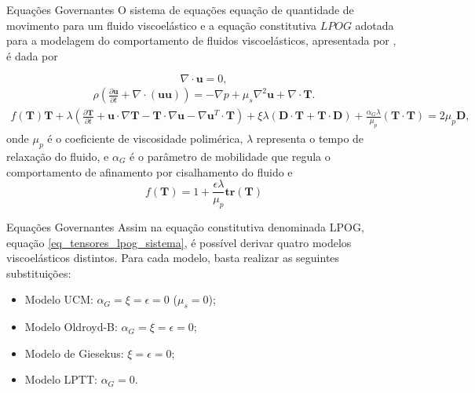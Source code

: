 \begin{frame}{Equações Governantes}
O sistema de equações equação de quantidade de movimento para um fluido viscoelástico e a equação constitutiva $LPOG$ adotada para a modelagem do comportamento de fluidos viscoelásticos, apresentada por \cite{furlan2022linear}, é dada por

\begin{equation}\label{eq_conservacao_massa_sistema}
    \nabla \cdot \mathbf{u} = 0,
\end{equation}
\begin{equation}
    \begin{split}
        \rho \left( \frac{\partial \mathbf{u}}{\partial t} + \nabla \cdot (\mathbf{uu}) \right) = -\nabla p + \mu_s \nabla^2 \mathbf{u} + \nabla \cdot \mathbf{T}.
    \end{split}\label{eq_conservacao_momentum_nao_newtoniano_sistema}
\end{equation}
\begin{equation}
    \begin{split}
        f(\mathbf{T})\mathbf{T} + \lambda \left(\frac{\partial \mathbf{T}}{\partial t} + \mathbf{u} \cdot \nabla \mathbf{T} - \mathbf{T} \cdot\nabla \mathbf{u} - \nabla \mathbf{u}^T \cdot \mathbf{T} \right) + \xi\lambda (\mathbf{D} \cdot \mathbf{T} + \mathbf{T} \cdot \mathbf{D}) + \frac{\alpha_G \lambda}{\mu_p} (\mathbf{T} \cdot \mathbf{T}) = 2 \mu_p \mathbf{D},
    \end{split}\label{eq_tensores_lpog_sistema}
\end{equation}
onde $\mu_p$ é o coeficiente de viscosidade polimérica, $\lambda$ representa o tempo de relaxação do fluido, e $\alpha_G$ é o parâmetro de mobilidade que regula o comportamento de afinamento por cisalhamento do fluido e
\begin{equation*}
    f(\mathbf{T}) = 1 + \frac{\epsilon \lambda}{\mu_p} \textbf{tr}(\mathbf{T})
\end{equation*}
\end{frame}

\begin{frame}{Equações Governantes}
Assim na equação constitutiva denominada LPOG, equação \eqref{eq_tensores_lpog_sistema}, é possível derivar quatro modelos viscoelásticos distintos. Para cada modelo, basta realizar as seguintes substituições:
\begin{itemize}
    \item Modelo UCM: $\alpha_G = \xi = \epsilon = 0$ ($\mu_s = 0$); 
    \item Modelo Oldroyd-B: $\alpha_G = \xi = \epsilon = 0$;
    \item Modelo de Giesekus: $\xi = \epsilon = 0$;
    \item Modelo LPTT: $\alpha_G = 0$.
\end{itemize}
\end{frame}

